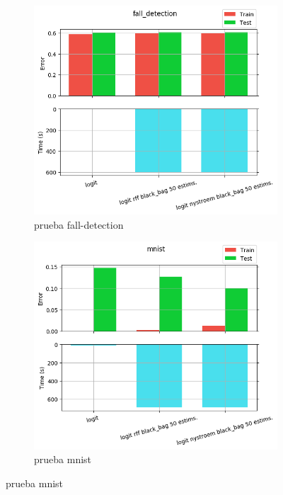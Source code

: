 \begin{figure}[ht]
  \centering
  \begin{subfigure}[b]{0.5\linewidth}
    \centering\includegraphics[width=\imgscale\linewidth]{Figures/2_2/fall_detection}
    \caption{prueba fall-detection}
    \label{fig:2_2_fall_detection}
  \end{subfigure}%
  \begin{subfigure}[b]{0.5\linewidth}
    \centering\includegraphics[width=\imgscale\linewidth]{Figures/2_2/mnist}
    \caption{prueba mnist}
    \label{fig:2_2_mnist}
  \end{subfigure}
\end{figure}


